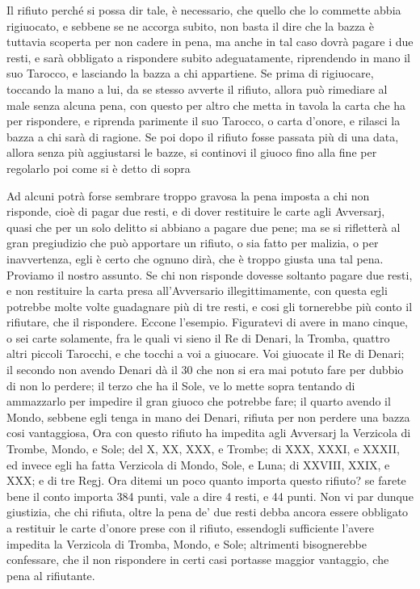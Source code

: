 \documentclass[11pt,a6paper]{article}
\begin{document}
Il rifiuto perché si possa dir tale, è necessario, che quello che lo commette abbia rigiuocato, e sebbene se ne accorga
subito, non basta il dire che la bazza è tuttavia scoperta per non cadere in pena, ma anche in tal caso dovrà pagare i due resti, e sarà obbligato a rispondere subito adeguatamente, riprendendo in mano il suo Tarocco, e lasciando la bazza a chi appartiene. Se prima di rigiuocare, toccando la mano a lui, da se stesso avverte il rifiuto, allora può rimediare al male senza alcuna pena, con questo per altro che metta in tavola la carta che ha per rispondere, e riprenda parimente il suo Tarocco, o carta d'onore, e rilasci la bazza a chi sarà di ragione. Se poi dopo il rifiuto fosse passata più di una data, allora senza più aggiustarsi le bazze, si continovi il giuoco fino alla fine per regolarlo poi come si è detto di sopra


Ad alcuni potrà forse sembrare troppo gravosa la pena imposta a chi non risponde, cioè di pagar due resti, e di dover restituire le carte agli Avversarj, quasi che per un solo delitto si abbiano a pagare due pene; ma se si rifletterà al gran pregiudizio che può apportare un rifiuto, o sia fatto per malizia, o per inavvertenza, egli è certo che ognuno dirà, che è troppo giusta una tal pena. Proviamo il nostro assunto. Se chi non risponde dovesse soltanto pagare due resti, e non restituire la carta presa all'Avversario illegittimamente, con questa egli potrebbe molte volte guadagnare più di tre resti, e cosi gli tornerebbe più conto il rifiutare, che il rispondere. Eccone l'esempio. Figuratevi di avere in mano cinque, o sei carte solamente, fra le quali vi sieno il Re di Denari, la Tromba, quattro altri piccoli Tarocchi, e che tocchi a voi a giuocare. Voi giuocate il Re di Denari; il secondo non avendo Denari dà il 30 che non si era mai potuto fare per dubbio di non lo perdere; il terzo che ha il Sole, ve lo mette sopra tentando di ammazzarlo per impedire
il gran giuoco che potrebbe fare; il quarto avendo il Mondo, sebbene egli tenga in mano dei Denari, rifiuta per non perdere una bazza cosi vantaggiosa, Ora con questo rifiuto ha impedita agli Avversarj la Verzicola di Trombe, Mondo, e Sole; del X, XX, XXX, e Trombe; di XXX, XXXI, e XXXII, ed invece egli ha fatta Verzicola di Mondo, Sole, e Luna; di XXVIII, XXIX, e XXX; e di tre Regj. Ora ditemi un poco quanto importa questo rifiuto? se farete bene il conto importa 384 punti, vale a dire 4 resti, e 44 punti. Non vi par dunque giustizia, che chi rifiuta, oltre la pena de' due resti debba ancora essere obbligato a restituir le carte d'onore prese con il rifiuto, essendogli sufficiente l'avere impedita la Verzicola di Tromba, Mondo, e Sole; altrimenti bisognerebbe confessare, che il non rispondere in certi casi portasse maggior vantaggio, che pena al rifiutante.
\end{document}
